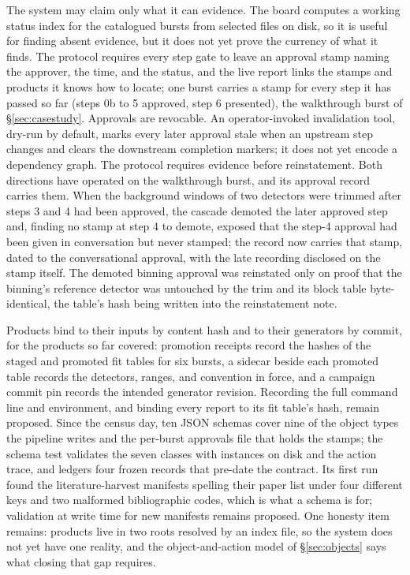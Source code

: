 The system may claim only what it can evidence. The board computes a
working status index for the catalogued bursts from selected files on
disk, so it is useful for finding absent evidence, but it does not yet
prove the currency of what it finds. The protocol requires every step gate
to leave an approval stamp naming the approver, the time, and the status,
and the live report links the stamps and products it knows how to locate;
one burst carries a stamp for every step it has passed so far (steps 0b to 5
approved, step 6 presented), the walkthrough burst of
\S\ref{sec:casestudy}. Approvals are revocable. An operator-invoked
invalidation tool, dry-run by default, marks every later approval stale
when an upstream step changes and clears the downstream completion markers;
it does not yet encode a dependency graph. The protocol requires evidence
before reinstatement. Both directions have operated on the walkthrough
burst, and its approval record carries them. When the background windows
of two detectors were trimmed after steps 3 and 4 had been approved, the
cascade demoted the later approved step and, finding no stamp at step 4 to
demote, exposed that the step-4 approval had been given in conversation
but never stamped; the record now carries that stamp, dated to the
conversational approval, with the late recording disclosed on the stamp
itself. The demoted binning approval was reinstated only on proof that the
binning's reference detector was untouched by the trim and its block table
byte-identical, the table's hash being written into the reinstatement
note.

Products bind to their inputs by content hash and to their generators by
commit, for the products so far covered: promotion receipts record the
hashes of the staged and promoted fit tables for six bursts\prov, a sidecar
beside each promoted table records the detectors, ranges, and convention in
force, and a campaign commit pin records the intended generator revision.
Recording the full command line and environment, and binding every report
to its fit table's hash, remain proposed. Since the census day, ten JSON schemas\prov{} cover nine of the object
types the pipeline writes and the per-burst approvals file that holds the
stamps; the schema
test validates the seven classes with instances on disk and the action
trace, and ledgers four frozen records that pre-date the contract. Its
first run found the literature-harvest manifests spelling their paper list
under four different keys and two malformed bibliographic codes, which is
what a schema is for; validation at write time for new manifests remains
proposed. One honesty item remains: products live in two roots resolved by
an index file, so the system does not yet have one reality, and the
object-and-action model of \S\ref{sec:objects} says what closing that gap
requires.

